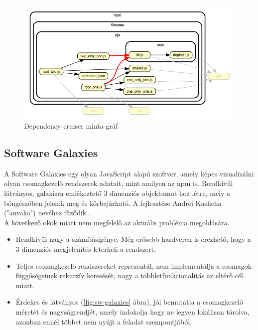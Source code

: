 	\begin{figure}[h]
		\centering
		\includegraphics[scale=0.4]{images/dep_cruiser.png}
		\caption{Dependency cruiser minta gráf}
		\label{fig:dep-cruiser}
	\end{figure}
	
	\subsection{Software Galaxies}
	
	A Software Galaxies egy olyan JavaScript alapú szoftver, amely képes vizualizálni olyan csomagkezelő rendszerek adatait, mint amilyen az npm is. Rendkívül látványos, galaxisra emlékeztető 3 dimenziós objektumot hoz létre, mely a böngészőben jelenik meg és körbejárható. A fejlesztése Andrei Kashcha ("anvaka") nevéhez fűződik \cite{anvaka-galaxies}.\\
	
	
	A következő okok miatt nem megfelelő az aktuális probléma megoldására.
	\begin{itemize}
		\item Rendkívül nagy a számításigénye. Még erősebb hardveren is érezhető, hogy a 3 dimenziós megjelenítés leterheli a rendszert.
		\item Teljes csomagkezelő rendszereket reprezentál, nem implementálja a csomagok függőségeinek rekurzív keresését, nagy a többletfunkcionalitás az eltérő cél miatt.
		\item Érdekes és látványos (\ref{fig:sw-galaxies} ábra), jól bemutatja a csomagkezelő méretét és nagyságrendjét, amely indokolja hogy ne legyen lokálisan tárolva, azonban ennél többet nem nyújt a feladat szempontjából.
	\end{itemize}
		
